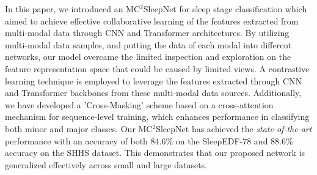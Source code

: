 In this paper, we introduced an MC$^2$SleepNet for sleep stage classification which aimed to achieve effective collaborative learning of the features extracted from multi-modal data through CNN and Transformer architectures.
% 
By utilizing multi-modal data samples, and putting the data of each modal into different networks, our model overcame the limited inspection and exploration on the feature representation space that could be caused by limited views.
%
A contrastive learning technique is employed to leverage the features extracted through CNN and Transformer backbones from these multi-modal data sources.
% 
Additionally, we have developed a 'Cross-Masking' scheme based on a cross-attention mechanism for sequence-level training, which enhances performance in classifying both minor and major classes.
%
Our MC$^2$SleepNet has achieved the \textit{state-of-the-art} performance with an accuracy of both 84.6\% on the SleepEDF-78 and 88.6\% accuracy on the SHHS dataset. This demonstrates that our proposed network is generalized effectively across small and large datasets.



